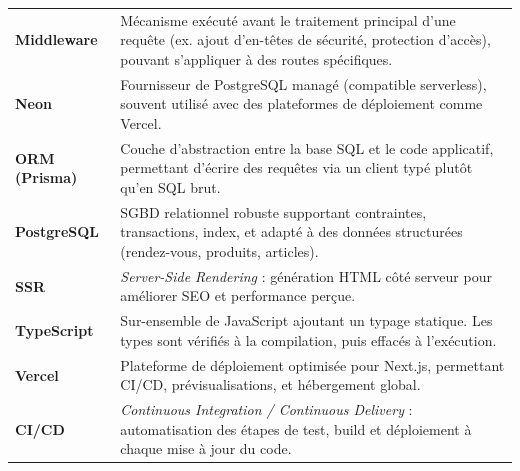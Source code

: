 \begin{longtable}{@{}p{}p{}@{}}
\textbf{Middleware} & Mécanisme exécuté avant le traitement principal d’une requête (ex. ajout d’en-têtes de sécurité, protection d’accès), pouvant s’appliquer à des routes spécifiques. \\

\textbf{Neon} & Fournisseur de PostgreSQL managé (compatible serverless), souvent utilisé avec des plateformes de déploiement comme Vercel. \\

\textbf{ORM (Prisma)} & Couche d’abstraction entre la base SQL et le code applicatif, permettant d’écrire des requêtes via un client typé plutôt qu’en SQL brut. \\

\textbf{PostgreSQL} & SGBD relationnel robuste supportant contraintes, transactions, index, et adapté à des données structurées (rendez-vous, produits, articles). \\

\textbf{SSR} & \textit{Server-Side Rendering} : génération HTML côté serveur pour améliorer SEO et performance perçue. \\

\textbf{TypeScript} & Sur-ensemble de JavaScript ajoutant un typage statique. Les types sont vérifiés à la compilation, puis effacés à l’exécution. \\

\textbf{Vercel} & Plateforme de déploiement optimisée pour Next.js, permettant CI/CD, prévisualisations, et hébergement global. \\

\textbf{CI/CD} & \textit{Continuous Integration / Continuous Delivery} : automatisation des étapes de test, build et déploiement à chaque mise à jour du code. \\

\bottomrule
\end{longtable}
\renewcommand{\arraystretch}{1.0}
